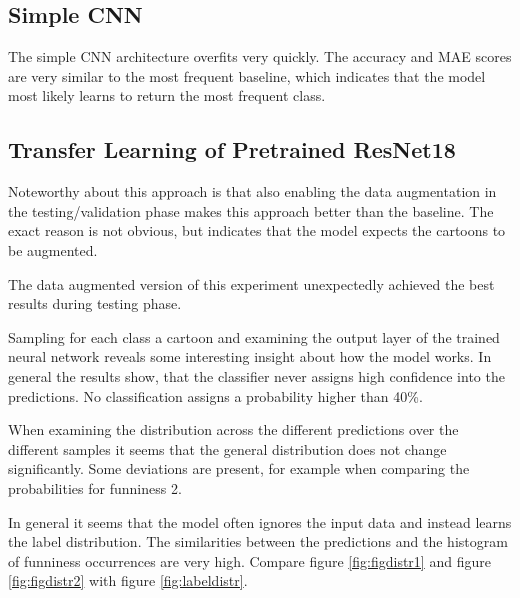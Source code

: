 \documentclass[draft,final,oneside]{vutinfth} %
\begin{document}
\subsection{Simple CNN}
The simple CNN architecture overfits very quickly. The accuracy and MAE scores are very similar to the most frequent baseline, which indicates that the model most likely learns to return the most frequent class.

\subsection{Transfer Learning of Pretrained ResNet18}
Noteworthy about this approach is that also enabling the data augmentation in the testing/validation phase makes this approach better than the baseline. The exact reason is not obvious, but indicates that the model expects the cartoons to be augmented.

The data augmented version of this experiment unexpectedly achieved the best results during testing phase.

Sampling for each class a cartoon and examining the output layer of the trained neural network reveals some interesting insight about how the model works. In general the results show, that the classifier never assigns high confidence into the predictions. No classification assigns a probability higher than 40\%.

When examining the distribution across the different predictions over the different samples it seems that the general distribution does not change significantly. Some deviations are present, for example when comparing the probabilities for funniness 2.

In general it seems that the model often ignores the input data and instead learns the label distribution. The similarities between the predictions and the histogram of funniness occurrences are very high. Compare figure \ref{fig:figdistr1} and figure \ref{fig:figdistr2} with figure \ref{fig:labeldistr}.
\end{document}
